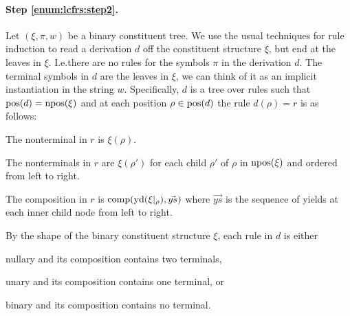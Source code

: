 \documentclass[../../document.tex]{subfiles}
\begin{document}
    \paragraph{Step \ref{enum:lcfrs:step2}.}
    Let \((\xi, \pi, w)\) be a binary constituent tree.
    We use the usual techniques for  rule induction to read a derivation \(d\) off the constituent structure \(\xi\), but end at the leaves in \(\xi\).
    I.e.\@ there are no rules for the  symbols \(\pi\) in the derivation \(d\).
    The terminal symbols in \(d\) are the leaves in \(\xi\), we can think of it as an implicit instantiation in the string \(w\).
    Specifically, \(d\) is a tree over  rules such that \(\operatorname{pos}(d) = \operatorname{npos}(\xi)\) and at each position \(\rho \in \operatorname{pos}(d)\) the rule \(d(\rho) = r\) is as follows:
    \begin{compactitem}
        \item The  nonterminal in \(r\) is \(\xi(\rho)\).
        \item The  nonterminals in \(r\) are \(\xi(\rho')\) for each child \(\rho'\) of \(\rho\) in \(\operatorname{npos}(\xi)\) and ordered from left to right.
        \item The composition in \(r\) is \(\mathrm{comp}(\operatorname{yd}(\xi|_\rho), \vec{ys})\) where \(\vec{ys}\) is the sequence of yields at each inner child node from left to right.
    \end{compactitem}
    By the shape of the binary constituent structure \(\xi\), each rule in \(d\) is either
    \begin{inparaitem}[]
        \item nullary and its composition contains two terminals,
        \item unary and its composition contains one terminal, or
        \item binary and its composition contains no terminal.
    \end{inparaitem}
\end{document}
